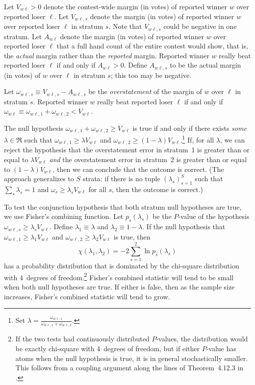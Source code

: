 \documentclass[runningheads]{llncs}
\newcommand{\beq}{\begin{equation}}
\newcommand{\eeq}{\end{equation}}
\begin{document}
Let $V_{w\ell} > 0$ denote the contest-wide margin (in votes) of reported winner 
$w$ over reported loser
$\ell$.
Let $V_{w\ell,s}$ denote the margin (in votes) of reported winner $w$ over reported loser $\ell$
in stratum $s$. 
Note that $V_{w\ell,s}$ could be negative in one stratum.
Let $A_{w\ell}$ denote the margin (in votes)
of reported winner $w$ over reported loser $\ell$ that 
a full hand count of the entire contest would show, that is, the \emph{actual} margin rather
than the \emph{reported} margin.
Reported winner $w$ really beat reported loser $\ell$ if and only if $A_{w\ell} > 0$.
Define $A_{w\ell,s}$ to be the actual margin (in votes) of $w$ over $\ell$ in stratum $s$;
this too may be negative.

Let $\omega_{w\ell,s} \equiv V_{w\ell,s} - A_{w\ell,s}$ be the \emph{overstatement}
of the margin of $w$ over $\ell$ in stratum $s$.
Reported winner $w$ really beat reported loser 
$\ell$ if and only if $\omega_{w\ell} \equiv \omega_{w\ell,1} + \omega_{w\ell,2} < V_{w\ell}$.

The null hypothesis $\omega_{w\ell, 1} + \omega_{w\ell, 2} \ge V_{w\ell}$ is true if and only if there exists \textit{some} $\lambda \in \Re$ such that 
$\omega_{w\ell, 1}\ge \lambda V_{w\ell}$ and 
$\omega_{w\ell, 2}\ge (1-\lambda) V_{w\ell}$.\footnote{%
  Set $\lambda = \frac{\omega_{w\ell, 1}}{\omega_{w\ell, 1}+\omega_{w\ell, 2}}$.
}
If, for all $\lambda$, we can reject the hypothesis that the 
overstatement error in stratum~1 is greater than or equal to $\lambda V_{w\ell}$ \emph{and} 
the overstatement error in stratum~2 is greater than or equal to $(1-\lambda) V_{w\ell}$, then
we can conclude that the outcome is correct.
(The approach generalizes to $S$ strata: if there is no tuple $( \lambda_s )_{s=1}^S$ such that
$\sum_s \lambda_s = 1$ and $\omega_s \ge \lambda_s V_{w\ell}$ for all $s$, then
the outcome is correct.)


To test the conjunction hypothesis that both stratum null hypotheses are true, we use 
Fisher's combining function.
Let $p_s(\lambda_s)$ be the $P$-value of the hypothesis $\omega_{w\ell,s} \ge \lambda_s V_{w\ell}$.
Define $\lambda_1 \equiv \lambda$ and $\lambda_2 \equiv 1-\lambda$.
If the null hypothesis that $\omega_{w\ell,1} \ge \lambda_1 V_{w\ell}$ and 
$\omega_{w\ell,2} \ge \lambda_2 V_{w\ell}$ is true, then 
\beq
   \chi(\lambda_1, \lambda_2) = -2 \sum_{s=1}^2 \ln p_s(\lambda_s)
\eeq
has a probability distribution that is dominated by the chi-square distribution with 4~degrees
of freedom.\footnote{%
   If the two tests had continuously distributed $P$-values, the distribution would be exactly
   chi-square with 4~degrees of freedom, but if either $P$-value has atoms when
   the null hypothesis is true, it is in general stochastically smaller.
   This follows from a coupling argument along the lines of Theorem~4.12.3 in \cite{grimmett01}.
}
Fisher's combined statistic will tend to be small when both null hypotheses are true.
If either is false, then as the sample size increases, Fisher's combined statistic will tend to grow.
\end{document}
